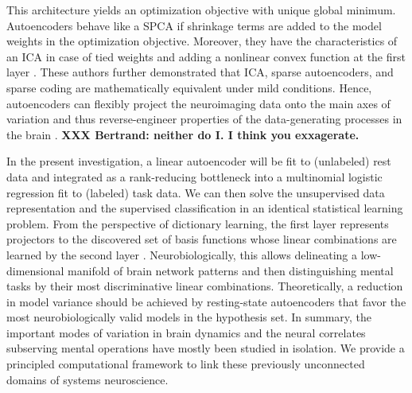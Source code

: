 \documentclass{article} %
\begin{document}
This architecture yields an optimization objective
with unique global minimum.
Autoencoders behave like a SPCA if shrinkage terms are added to the
model weights in the optimization objective.
Moreover, they have the characteristics of an ICA in case of tied weights
and adding a nonlinear convex function
at the first layer \cite{le2011ica}.
These authors further demonstrated that ICA, sparse autoencoders, and 
sparse coding are mathematically equivalent
under mild conditions.
%
Hence, autoencoders can flexibly project the neuroimaging data
onto the main axes of variation and thus %
reverse-engineer properties of the data-generating
processes in the brain \cite{olshausen96}.
\textbf{XXX Bertrand: neither do I. I think you exxagerate.}

In the present investigation,
a linear autoencoder will be fit to
(unlabeled) rest data and
integrated as a rank-reducing bottleneck
into a multinomial
logistic regression fit to
(labeled) task data.
We can then solve the unsupervised data representation and the
supervised classification in an identical statistical learning
problem.
%
From the perspective of dictionary learning, the first layer represents
projectors to the discovered set of basis functions
whose linear combinations are learned
by the second layer \cite{olshausen96}.
%
Neurobiologically, this allows 
delineating a low-dimensional manifold
of brain network patterns and then 
distinguishing mental tasks
by their most discriminative linear combinations.
%
Theoretically, a reduction in model variance should be achieved by
resting-state autoencoders that
favor the most neurobiologically
valid models in the hypothesis set.
%
In summary,
the important modes of variation in brain dynamics and
the neural correlates subserving mental operations
have mostly been studied in isolation.
We provide a principled computational framework to link these previously
unconnected domains of systems neuroscience.
\end{document}
